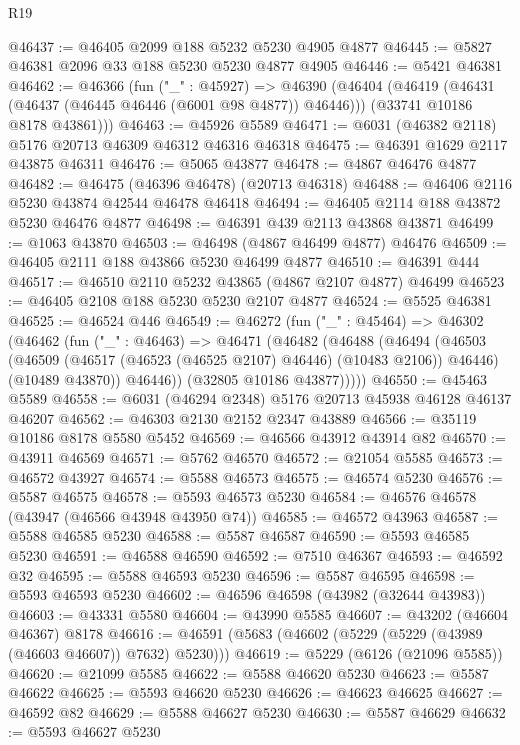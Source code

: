 \begin{lexlean}{R19}
\begin{coremodule}
@46437 := @46405 @2099 @188 @5232 @5230 @4905 @4877
@46445 := @5827 @46381 @2096 @33 @188 @5230 @5230 @4877 @4905
@46446 := @5421 @46381
@46462 := @46366
    (fun ("_" : @45927) =>
    @46390
      (@46404
        (@46419 (@46431 (@46437 (@46445 @46446 (@6001 @98 @4877)) @46446)))
        (@33741 @10186 @8178 @43861)))
@46463 := @45926 @5589
@46471 := @6031 (@46382 @2118) @5176 @20713 @46309 @46312 @46316 @46318
@46475 := @46391 @1629 @2117 @43875 @46311
@46476 := @5065 @43877
@46478 := @4867 @46476 @4877
@46482 := @46475 (@46396 @46478) (@20713 @46318)
@46488 := @46406 @2116 @5230 @43874 @42544 @46478 @46418
@46494 := @46405 @2114 @188 @43872 @5230 @46476 @4877
@46498 := @46391 @439 @2113 @43868 @43871
@46499 := @1063 @43870
@46503 := @46498 (@4867 @46499 @4877) @46476
@46509 := @46405 @2111 @188 @43866 @5230 @46499 @4877
@46510 := @46391 @444
@46517 := @46510 @2110 @5232 @43865 (@4867 @2107 @4877) @46499
@46523 := @46405 @2108 @188 @5230 @5230 @2107 @4877
@46524 := @5525 @46381
@46525 := @46524 @446
@46549 := @46272
    (fun ("_" : @45464) =>
    @46302
      (@46462
        (fun ("_" : @46463) =>
        @46471
          (@46482
            (@46488
              (@46494
                (@46503
                  (@46509 (@46517 (@46523 (@46525 @2107) @46446) (@10483 @2106)) @46446)
                  (@10489 @43870))
                @46446))
            (@32805 @10186 @43877)))))
@46550 := @45463 @5589
@46558 := @6031 (@46294 @2348) @5176 @20713 @45938 @46128 @46137 @46207
@46562 := @46303 @2130 @2152 @2347 @43889
@46566 := @35119 @10186 @8178 @5580 @5452
@46569 := @46566 @43912 @43914 @82
@46570 := @43911 @46569
@46571 := @5762 @46570
@46572 := @21054 @5585
@46573 := @46572 @43927
@46574 := @5588 @46573
@46575 := @46574 @5230
@46576 := @5587 @46575
@46578 := @5593 @46573 @5230
@46584 := @46576 @46578 (@43947 (@46566 @43948 @43950 @74))
@46585 := @46572 @43963
@46587 := @5588 @46585 @5230
@46588 := @5587 @46587
@46590 := @5593 @46585 @5230
@46591 := @46588 @46590
@46592 := @7510 @46367
@46593 := @46592 @32
@46595 := @5588 @46593 @5230
@46596 := @5587 @46595
@46598 := @5593 @46593 @5230
@46602 := @46596 @46598 (@43982 (@32644 @43983))
@46603 := @43331 @5580
@46604 := @43990 @5585
@46607 := @43202 (@46604 @46367) @8178
@46616 := @46591 (@5683 (@46602 (@5229 (@5229 (@43989 (@46603 @46607)) @7632) @5230)))
@46619 := @5229 (@6126 (@21096 @5585))
@46620 := @21099 @5585
@46622 := @5588 @46620 @5230
@46623 := @5587 @46622
@46625 := @5593 @46620 @5230
@46626 := @46623 @46625
@46627 := @46592 @82
@46629 := @5588 @46627 @5230
@46630 := @5587 @46629
@46632 := @5593 @46627 @5230

\end{coremodule}
\end{lexlean}

